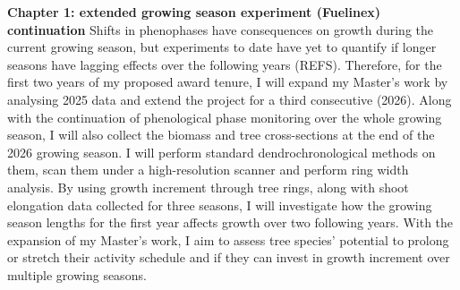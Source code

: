 \documentclass[12pt]{article}
\begin{document}
\textbf{Chapter 1: extended growing season experiment (Fuelinex) continuation}
Shifts in phenophases have consequences on growth during the current growing season, but experiments to date have yet to quantify if longer seasons have lagging effects over the following years (REFS). Therefore, for the first two years of my proposed award tenure, I will expand my Master's work by analysing 2025 data and extend the project for a third consecutive (2026). Along with the continuation of phenological phase monitoring over the whole growing season, I will also collect the biomass and tree cross-sections at the end of the 2026 growing season. I will perform standard dendrochronological methods on them, scan them under a high-resolution scanner and perform ring width analysis. By using growth increment through tree rings, along with shoot elongation data collected for three seasons, I will investigate how the growing season lengths for the first year affects growth over two following years. With the expansion of my Master's work, I aim to assess tree species’ potential to prolong or stretch their activity schedule and if they can invest in growth increment over multiple growing seasons. \\
\end{document}

